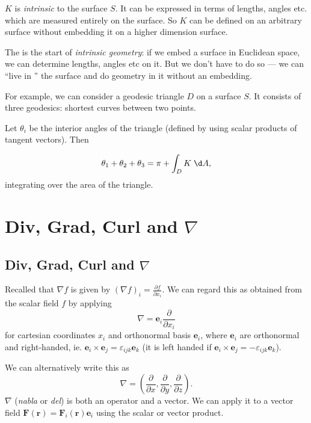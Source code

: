 \documentclass[a4paper]{article}
\begin{document}
\begin{thm}
  $K$ is \emph{intrinsic} to the surface $S$. It can be expressed in terms of lengths, angles etc. which are measured entirely on the surface. So $K$ can be defined on an arbitrary surface without embedding it on a higher dimension surface.
\end{thm}
The is the start of \emph{intrinsic geometry}: if we embed a surface in Euclidean space, we can determine lengths, angles etc on it. But we don't have to do so --- we can ``live in '' the surface and do geometry in it without an embedding.

For example, we can consider a geodesic triangle $D$ on a surface $S$. It consists of three geodesics: shortest curves between two points.

Let $\theta_i$ be the interior angles of the triangle (defined by using scalar products of tangent vectors). Then
\begin{thm}
  \[
    \theta_1 +\theta_2 + \theta_3 = \pi + \int_D K\; \d A,
  \]
  integrating over the area of the triangle.
\end{thm}

\section{Div, Grad, Curl and \texorpdfstring{$\nabla$}{del}}
\subsection{Div, Grad, Curl and \texorpdfstring{$\nabla$}{del}}
Recalled that $\nabla f$ is given by $(\nabla f)_i = \frac{\partial f}{\partial x_i}$. We can regard this as obtained from the scalar field $f$ by applying
\[
  \nabla = \mathbf{e}_i \frac{\partial}{\partial x_i}
\]
for cartesian coordinates $x_i$ and orthonormal basis $\mathbf{e}_i$, where $\mathbf{e}_i$ are orthonormal and right-handed, ie. $\mathbf{e}_i\times \mathbf{e}_j = \varepsilon_{ijk} \mathbf{e}_k$ (it is left handed if $\mathbf{e}_i\times \mathbf{e}_j = -\varepsilon_{ijk} \mathbf{e}_k$).

We can alternatively write this as
\[
  \nabla = \left(\frac{\partial}{\partial x}, \frac{\partial }{\partial y}, \frac{\partial}{\partial z}\right).
\]
$\nabla$ (\emph{nabla} or \emph{del}) is both an operator and a vector. We can apply it to a vector field $\mathbf{F}(\mathbf{r}) = \mathbf{F}_i(\mathbf{r})\mathbf{e}_i$ using the scalar or vector product.
\end{document}
